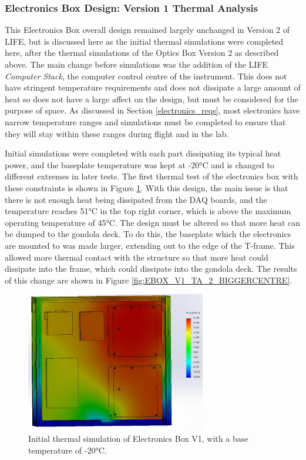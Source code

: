 \subsubsection{Electronics Box Design: Version 1 Thermal Analysis}
This Electronics Box overall design remained largely unchanged in Version 2 of LIFE, but is discussed here as the initial thermal simulations were completed here, after the thermal simulations of the Optics Box Version 2 as described above. The main change before simulations was the addition of the LIFE \textit{Computer Stack}, the computer control centre of the instrument. This does not have stringent temperature requirements and does not dissipate a large amount of heat so does not have a large affect on the design, but must be considered for the purpose of space. As discussed in Section \ref{electronics_reqs}, most electronics have narrow temperature ranges and simulations must be completed to ensure that they will stay within these ranges during flight and in the lab.

Initial simulations were completed with each part dissipating its typical heat power, and the baseplate temperature was kept at -20°C and is changed to different extremes in later tests. The first thermal test of the electronics box with these constraints is shown in Figure \ref{fig:EBOX_V1_TA_1_SQUARECENTRE}. With this design, the main issue is that there is not enough heat being dissipated from the DAQ boards, and the temperature reaches 51°C in the top right corner, which is above the maximum operating temperature of 45°C. The design must be altered so that more heat can be dumped to the gondola deck. To do this, the baseplate which the electronics are mounted to was made larger, extending out to the edge of the T-frame. This allowed more thermal contact with the structure so that more heat could dissipate into the frame, which could dissipate into the gondola deck. The results of this change are shown in Figure \ref{fig:EBOX_V1_TA_2_BIGGERCENTRE}.

\begin{figure}
    \centering
    \includegraphics[width=0.7\textwidth]{chap3_images/LIFE_V2_images/TA_-20_square_centre_plate.JPG}
    \caption{Initial thermal simulation of Electronics Box V1, with a base temperature of -20°C.}
    \label{fig:EBOX_V1_TA_1_SQUARECENTRE}
\end{figure}

